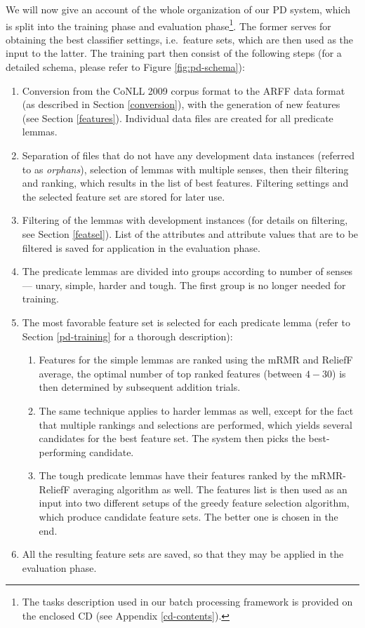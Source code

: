 \documentclass[12pt,notitlepage,a4paper]{report}
\begin{document}
We will now give an account of the whole organization of our PD system, which is split into the training phase and evaluation phase\footnote{The tasks description used in our batch processing framework is provided on the enclosed CD (see Appendix \ref{cd-contents}).}. The former serves for obtaining the best classifier settings, i.e.\ feature sets, which are then used as the input to the latter. The training part then consist of the following steps (for a detailed schema, please refer to Figure \ref{fig:pd-schema}):
\begin{enumerate}
    \item Conversion from the CoNLL 2009 corpus format to the ARFF data format (as described in Section \ref{conversion}), with the generation of new features (see Section \ref{features}). Individual data files are created for all predicate lemmas.
    \item Separation of files that do not have any development data instances (referred to as \emph{orphans}), selection of lemmas with multiple senses, then their filtering and ranking, which results in the list of best features. Filtering settings and the selected feature set are stored for later use.
    \item Filtering of the lemmas with development instances (for details on filtering, see Section \ref{featsel}). List of the attributes and attribute values that are to be filtered is saved for application in the evaluation phase.
    \item The predicate lemmas are divided into groups according to number of senses --- unary, simple, harder and tough. The first group is no longer needed for training.
    \item The most favorable feature set is selected for each predicate lemma (refer to Section \ref{pd-training} for a thorough description):
    \begin{enumerate}
        \item Features for the simple lemmas are ranked using the mRMR and ReliefF average, the optimal number of top ranked features (between $4-30$) is then determined by subsequent addition trials.
        \item The same technique applies to harder lemmas as well, except for the fact that multiple rankings and selections are performed, which yields several candidates for the best feature set. The system then picks the best-performing candidate.
        \item The tough predicate lemmas have their features ranked by the mRMR-ReliefF averaging algorithm as well. The features list is then used as an input into two different setups of the greedy feature selection algorithm, which produce candidate feature sets. The better one is chosen in the end.
    \end{enumerate}
    \item All the resulting feature sets are saved, so that they may be applied in the evaluation phase.
\end{enumerate}
\end{document}
